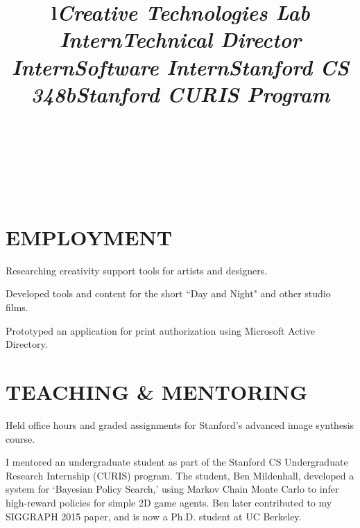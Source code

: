 \documentclass[line,margin]{res}
\begin{document}
\begin{resume}


\begin{format}
\\
\title{l}\\
\body\\
\end{format}


\section{EMPLOYMENT}

\title{\emph{Creative Technologies Lab Intern}}
\begin{position}
Researching creativity support tools for artists and designers.
\end{position}

\title{\emph{Technical Director Intern}}
\begin{position}
Developed tools and content for the short ``Day and Night" and other studio films.
\end{position}

\title{\emph{Software Intern}}
\begin{position}
Prototyped an application for print authorization using Microsoft Active Directory.
\end{position}


\section{TEACHING \& MENTORING}


\title{\emph{Stanford CS 348b}}
\begin{position}
Held office hours and graded assignments for Stanford's advanced image synthesis course.
\end{position}

\title{\emph{Stanford CURIS Program}}
\begin{position}
I mentored an undergraduate student as part of the Stanford CS Undergraduate Research Internship (CURIS) program. The student, Ben Mildenhall, developed a system for `Bayesian Policy Search,' using Markov Chain Monte Carlo to infer high-reward policies for simple 2D game agents. Ben later contributed to my SIGGRAPH 2015 paper, and is now a Ph.D. student at UC Berkeley.
\end{position}


\end{resume}
\end{document}
